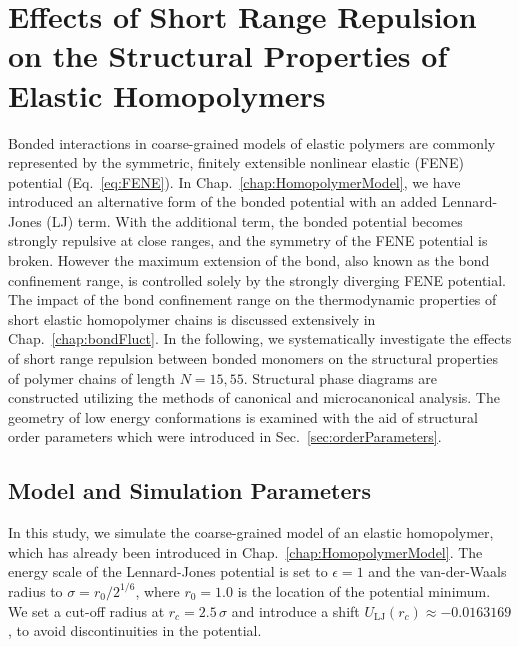 \documentclass[12pt]{report}
\begin{document}

\chapter{Effects of Short Range Repulsion on the Structural Properties of Elastic Homopolymers}

Bonded interactions in coarse-grained models of elastic polymers are commonly represented by the symmetric, finitely extensible nonlinear elastic (FENE) potential (Eq.~\ref{eq:FENE}). In Chap.~\ref{chap:HomopolymerModel}, we have introduced an alternative form of the bonded potential with an added Lennard-Jones (LJ) term. With the additional term, the bonded potential becomes strongly repulsive at close ranges, and the symmetry of the FENE potential is broken. However the maximum extension of the bond, also known as the bond confinement range, is controlled solely by the strongly diverging FENE potential.  The impact of the bond confinement range on the thermodynamic properties of short elastic homopolymer chains is discussed extensively in Chap.~\ref{chap:bondFluct}. In the following, we systematically investigate the effects of short range repulsion between bonded monomers on the structural properties of polymer chains of length $N = 15,55$. 
\newpage
\noindent
Structural phase diagrams are constructed utilizing the methods of canonical and microcanonical analysis. The geometry of low energy conformations is examined with the aid of structural order parameters which were introduced in Sec.~\ref{sec:orderParameters}.

\section{Model and Simulation Parameters}
In this study, we simulate the coarse-grained model of an elastic homopolymer, which has already been introduced in Chap.~\ref{chap:HomopolymerModel}. The energy scale of the Lennard-Jones potential is set to $\epsilon=1$ and the van-der-Waals radius to $\sigma=r_0/2^{1/6}$, where $r_0 = 1.0$ is the location of the potential minimum. We set a cut-off radius at $r_c=2.5\,\sigma$ and introduce a shift $U_{\mathrm{LJ}}(r_{c}) \approx -0.0163169$, to avoid discontinuities in the potential.
\end{document}
